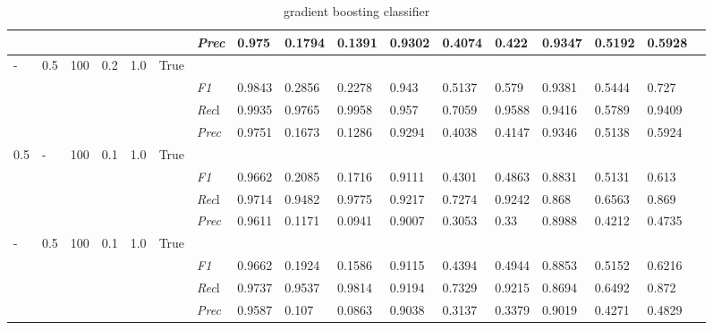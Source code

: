 \begin{table}[]
\begin{tabularx}{\textwidth}{XXXXXX|X|XXX|XXX|XXXX}
& & & & & & \textit{Prec} & 0.975 & 0.1794 & 0.1391 & 0.9302 & 0.4074 & 0.422 & 0.9347 & 0.5192 & 0.5928 \\ \midrule
- & 0.5 & 100 & 0.2 & 1.0 &True & & & & & & & & & \\
& & & & & & \textit{F1} & 0.9843 & 0.2856 & 0.2278 & 0.943 & 0.5137        & 0.579        & 0.9381        & 0.5444        & 0.727        \\
& & & & & & \textit{Rec}l & 0.9935 & 0.9765 & 0.9958    & 0.957 & 0.7059    & 0.9588    & 0.9416    & 0.5789    & 0.9409    \\
& & & & & & \textit{Prec} & 0.9751 & 0.1673 & 0.1286 & 0.9294 & 0.4038 & 0.4147 & 0.9346 & 0.5138 & 0.5924 \\ \midrule
0.5 & - & 100 & 0.1 & 1.0 &True & & & & & & & & & \\
& & & & & & \textit{F1} & 0.9662 & 0.2085 & 0.1716 & 0.9111 & 0.4301        & 0.4863        & 0.8831        & 0.5131        & 0.613        \\
& & & & & & \textit{Rec}l & 0.9714 & 0.9482 & 0.9775    & 0.9217 & 0.7274    & 0.9242    & 0.868    & 0.6563    & 0.869    \\
& & & & & & \textit{Prec} & 0.9611 & 0.1171 & 0.0941 & 0.9007 & 0.3053 & 0.33 & 0.8988 & 0.4212 & 0.4735 \\ \midrule
- & 0.5 & 100 & 0.1 & 1.0 &True & & & & & & & & & \\
& & & & & & \textit{F1} & 0.9662 & 0.1924 & 0.1586 & 0.9115 & 0.4394        & 0.4944        & 0.8853        & 0.5152        & 0.6216        \\
& & & & & & \textit{Rec}l & 0.9737 & 0.9537 & 0.9814    & 0.9194 & 0.7329    & 0.9215    & 0.8694    & 0.6492    & 0.872    \\
& & & & & & \textit{Prec} & 0.9587 & 0.107 & 0.0863 & 0.9038 & 0.3137 & 0.3379 & 0.9019 & 0.4271 & 0.4829 \\ \midrule
\end{tabularx}
\caption{gradient boosting classifier}
\label{tab:all_results_gradient_boosting_classifier}
\end{table}

